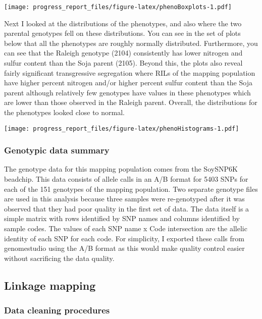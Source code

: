 \documentclass[
]{article}
\begin{document}
\texttt{[image: progress\_report\_files/figure-latex/phenoBoxplots-1.pdf]}

Next I looked at the distributions of the phenotypes, and also where the
two parental genotypes fell on these distributions. You can see in the
set of plots below that all the phenotypes are roughly normally
distributed. Furthermore, you can see that the Raleigh genotype (2104)
consistently has lower nitrogen and sulfur content than the Soja parent
(2105). Beyond this, the plots also reveal fairly significant
transgressive segregation where RILs of the mapping population have
higher percent nitrogen and/or higher percent sulfur content than the
Soja parent although relatively few genotypes have values in these
phenotypes which are lower than those observed in the Raleigh parent.
Overall, the distributions for the phenotypes looked close to normal.

\newpage

\texttt{[image: progress\_report\_files/figure-latex/phenoHistograms-1.pdf]}

\hypertarget{genotypic-data-summary}{%
\subsubsection{Genotypic data summary}\label{genotypic-data-summary}}

The genotype data for this mapping population comes from the SoySNP6K
beadchip. This data consists of allele calls in an A/B format for 5403
SNPs for each of the 151 genotypes of the mapping population. Two
separate genotype files are used in this analysis because three samples
were re-genotyped after it was observed that they had poor quality in
the first set of data. The data itself is a simple matrix with rows
identified by SNP names and columns identified by sample codes. The
values of each SNP name x Code intersection are the allelic identity of
each SNP for each code. For simplicity, I exported these calls from
genomestudio using the A/B format as this would make quality control
easier without sacrificing the data quality.

\hypertarget{linkage-mapping}{%
\subsection{Linkage mapping}\label{linkage-mapping}}

\hypertarget{data-cleaning-procedures}{%
\subsubsection{Data cleaning
procedures}\label{data-cleaning-procedures}}
\end{document}
